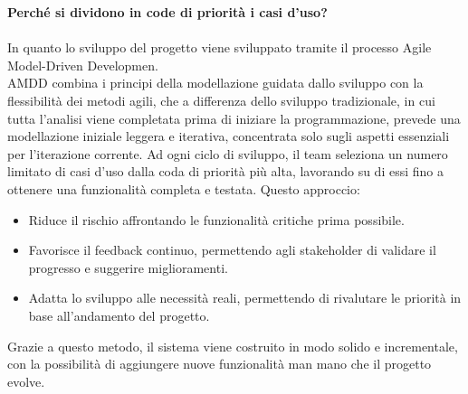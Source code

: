 \textbf{Perché si dividono in code di priorità i casi d'uso?}
\\
\\
In quanto lo sviluppo del progetto viene sviluppato tramite il processo Agile Model-Driven Developmen.
\\
AMDD combina i principi della modellazione guidata dallo sviluppo con la flessibilità dei metodi agili, che a differenza dello sviluppo tradizionale, in cui tutta l’analisi viene completata prima di iniziare la programmazione, prevede una modellazione iniziale leggera e iterativa, concentrata solo sugli aspetti essenziali per l’iterazione corrente.
\newline
Ad ogni ciclo di sviluppo, il team seleziona un numero limitato di casi d’uso dalla coda di priorità più alta, lavorando su di essi fino a ottenere una funzionalità completa e testata. Questo approccio:
\begin{itemize}
    \item Riduce il rischio affrontando le funzionalità critiche prima possibile.
    \item Favorisce il feedback continuo, permettendo agli stakeholder di validare il progresso e suggerire miglioramenti.
    \item Adatta lo sviluppo alle necessità reali, permettendo di rivalutare le priorità in base all’andamento del progetto.
\end{itemize}
Grazie a questo metodo, il sistema viene costruito in modo solido e incrementale, con la possibilità di aggiungere nuove funzionalità man mano che il progetto evolve.